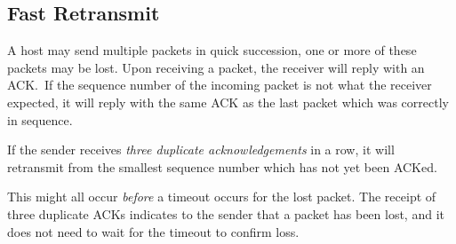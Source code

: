 \subsection{Fast Retransmit}

A host may send multiple packets in quick succession, one or more
of these packets may be lost. Upon receiving a packet, the receiver
will reply with an ACK.\ If the sequence number of the incoming packet
is not what the receiver expected, it will reply with the same ACK
as the last packet which was correctly in sequence.

If the sender receives \textit{three duplicate acknowledgements}
in a row, it will retransmit from the smallest sequence number which
has not yet been ACKed.

This might all occur \textit{before} a timeout occurs for the lost
packet. The receipt of three duplicate ACKs indicates to the sender
that a packet has been lost, and it does not need to wait for the
timeout to confirm loss.